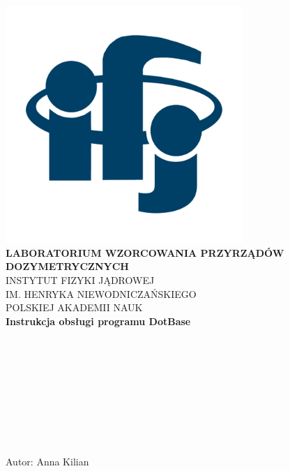 
\begin{center}
\includegraphics[width=9cm]{obrazki/logo_ifj_kolor2.pdf}\\[9mm]
{\Large \textbf{LABORATORIUM WZORCOWANIA PRZYRZĄDÓW DOZYMETRYCZNYCH}}\\[5mm]
INSTYTUT FIZYKI JĄDROWEJ\\
IM. HENRYKA NIEWODNICZAŃSKIEGO\\
POLSKIEJ AKADEMII NAUK\\[8mm]
{\Large \textbf{Instrukcja obsługi programu DotBase}}\\[8mm]
\end{center}

~

~

~

~

~

\begin{flushright}
	Autor: Anna Kilian 
\end{flushright}

\czystastopka
{}

\pagebreak


\czystastopka

\pagebreak